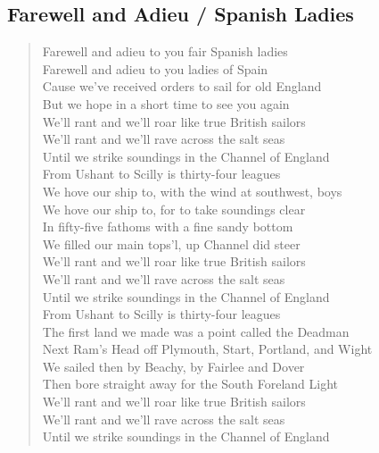 \documentclass[11pt]{article}
\begin{document}
\subsection{Farewell and Adieu / Spanish Ladies}
\label{sec:org720d2e7}
\begin{verse}
Farewell and adieu to you fair Spanish ladies\\
Farewell and adieu to you ladies of Spain\\
Cause we’ve received orders to sail for old England\\
But we hope in a short time to see you again\\
\vspace*{1em}
We’ll rant and we’ll roar like true British sailors\\
We’ll rant and we’ll rave across the salt seas\\
Until we strike soundings in the Channel of England\\
From Ushant to Scilly is thirty-four leagues\\
\vspace*{1em}
We hove our ship to, with the wind at southwest, boys\\
We hove our ship to, for to take soundings clear\\
In fifty-five fathoms with a fine sandy bottom\\
We filled our main tops’l, up Channel did steer\\
We’ll rant and we’ll roar like true British sailors\\
We’ll rant and we’ll rave across the salt seas\\
Until we strike soundings in the Channel of England\\
From Ushant to Scilly is thirty-four leagues\\
\vspace*{1em}
The first land we made was a point called the Deadman\\
Next Ram's Head off Plymouth, Start, Portland, and Wight\\
We sailed then by Beachy, by Fairlee and Dover\\
Then bore straight away for the South Foreland Light\\
\vspace*{1em}
We’ll rant and we’ll roar like true British sailors\\
We’ll rant and we’ll rave across the salt seas\\
Until we strike soundings in the Channel of England\\

\end{verse}
\end{document}
